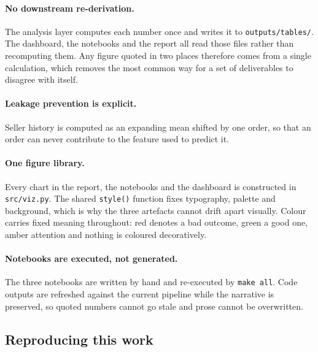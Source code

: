 \documentclass[11pt,a4paper]{article}
\begin{document}


\paragraph{No downstream re-derivation.} The analysis layer computes each number
once and writes it to \texttt{outputs/tables/}. The dashboard, the notebooks and the
report all read those files rather than recomputing them. Any figure quoted in two
places therefore comes from a single calculation, which removes the most common way
for a set of deliverables to disagree with itself.

\paragraph{Leakage prevention is explicit.} Seller history is computed as an
expanding mean shifted by one order, so that an order can never contribute to the
feature used to predict it.



\paragraph{One figure library.} Every chart in the report, the notebooks and the
dashboard is constructed in \texttt{src/viz.py}. The shared \texttt{style()} function
fixes typography, palette and background, which is why the three artefacts cannot
drift apart visually. Colour carries fixed meaning throughout: red denotes a bad
outcome, green a good one, amber attention and nothing is coloured decoratively.

\paragraph{Notebooks are executed, not generated.} The three notebooks are written
by hand and re-executed by \texttt{make all}. Code outputs are refreshed against the
current pipeline while the narrative is preserved, so quoted numbers cannot go stale
and prose cannot be overwritten.

\subsection{Reproducing this work}
\end{document}
